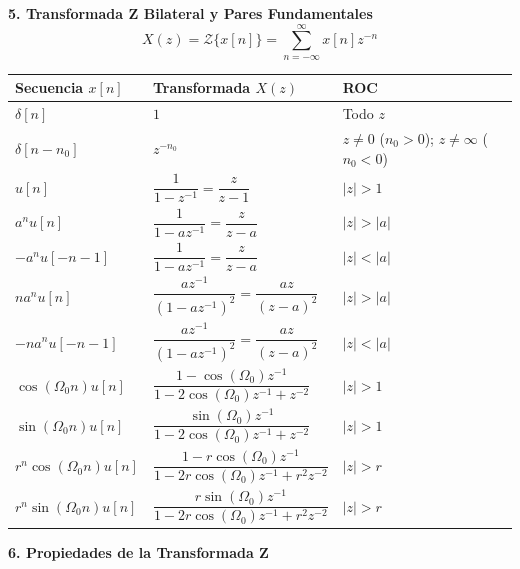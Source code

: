 \documentclass[10pt, a4paper, twocolumn]{article}
\begin{document}
\vspace{2pt}
\textbf{5. Transformada Z Bilateral y Pares Fundamentales}
\[
    X(z) = \mathcal{Z}\{x[n]\} = \sum_{n=-\infty}^{\infty} x[n] z^{-n}
\]
{\scriptsize
\setlength{\tabcolsep}{2.5pt}
\renewcommand{\arraystretch}{1.35}
\begin{tabular}{@{}lll@{}}
\toprule
\textbf{Secuencia $x[n]$} & \textbf{Transformada $X(z)$} & \textbf{ROC} \\
\midrule
$\delta[n]$ & $1$ & Todo $z$ \\
$\delta[n - n_0]$ & $z^{-n_0}$ & $z \neq 0$ ($n_0>0$); $z \neq \infty$ ($n_0<0$) \\
$u[n]$ & $\dfrac{1}{1 - z^{-1}} = \dfrac{z}{z - 1}$ & $|z| > 1$ \\
$a^n u[n]$ & $\dfrac{1}{1 - a z^{-1}} = \dfrac{z}{z - a}$ & $|z| > |a|$ \\
$-a^n u[-n-1]$ & $\dfrac{1}{1 - a z^{-1}} = \dfrac{z}{z - a}$ & $|z| < |a|$ \\
$n a^n u[n]$ & $\dfrac{a z^{-1}}{(1 - a z^{-1})^2} = \dfrac{a z}{(z - a)^2}$ & $|z| > |a|$ \\
$-n a^n u[-n-1]$ & $\dfrac{a z^{-1}}{(1 - a z^{-1})^2} = \dfrac{a z}{(z - a)^2}$ & $|z| < |a|$ \\
$\cos(\Omega_0 n) u[n]$ & $\dfrac{1 - \cos(\Omega_0)z^{-1}}{1 - 2\cos(\Omega_0)z^{-1} + z^{-2}}$ & $|z| > 1$ \\
$\sin(\Omega_0 n) u[n]$ & $\dfrac{\sin(\Omega_0)z^{-1}}{1 - 2\cos(\Omega_0)z^{-1} + z^{-2}}$ & $|z| > 1$ \\
$r^n \cos(\Omega_0 n) u[n]$ & $\dfrac{1 - r\cos(\Omega_0)z^{-1}}{1 - 2r\cos(\Omega_0)z^{-1} + r^2 z^{-2}}$ & $|z| > r$ \\
$r^n \sin(\Omega_0 n) u[n]$ & $\dfrac{r\sin(\Omega_0)z^{-1}}{1 - 2r\cos(\Omega_0)z^{-1} + r^2 z^{-2}}$ & $|z| > r$ \\
\bottomrule
\end{tabular}
}

\vspace{3pt}
\textbf{6. Propiedades de la Transformada Z}
\end{document}

